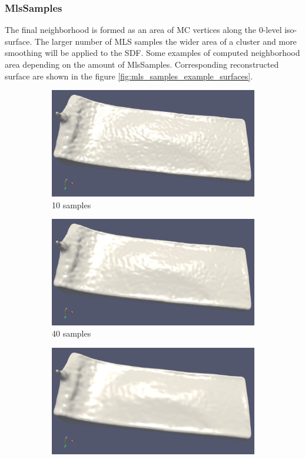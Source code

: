 \subsubsection{MlsSamples}
The final neighborhood is formed as an area of MC vertices along the 0-level iso-surface. The larger number of MLS samples the wider area of a cluster and more smoothing will be applied to the SDF. Some examples of computed neighborhood area depending on the amount of MlsSamples. Corresponding reconstructed surface are shown in the figure \ref{fig:mls_samples_example_surfaces}.
\begin{figure}[H]
	\begin{center}
		\begin{subfigure}[b]{0.4\textwidth}
			\includegraphics[width=\textwidth]{figures/MlsSamples10.png}
			\caption{10 samples}
		\end{subfigure}
		\begin{subfigure}[b]{0.4\textwidth}
			\includegraphics[width=\textwidth]{figures/MlsSamples40.png}
			\caption{40 samples}
		\end{subfigure}
		\begin{subfigure}[b]{0.4\textwidth}
			\includegraphics[width=\textwidth]{figures/MlsSamples80png.png}

\end{subfigure}
\end{center}
\end{figure}
